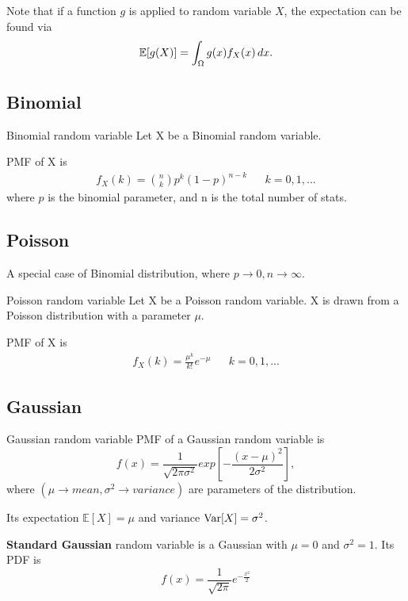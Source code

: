 Note that if a function $g$ is applied to random variable $X$, the expectation can be found via
\begin{equation*}
  \mathbb{E}[g(X)]=\int_{\Omega}g(x)f_X(x)\,dx.
\end{equation*}

\subsection{Binomial}

\begin{fact}{Binomial random variable}{}
  Let X be a Binomial random variable.

  PMF of X is
  \begin{align}
    f_X(k) = \binom{n}{k}p^k(1-p)^{n-k} &&k=0,1,...
  \end{align}
  where $p$ is the binomial parameter, and n is the total number of stats.

\end{fact}

\subsection{Poisson}
A special case of Binomial distribution, where $p\rightarrow0,n\rightarrow\infty$.

\begin{fact}{Poisson random variable}{}
  Let X be a Poisson random variable.
  X is drawn from a Poisson distribution with a parameter $\mu$.

  PMF of X is
  \begin{align}
    f_X(k) =  \frac{\mu^k}{k!}e^{-\mu} && k = 0,1,...
  \end{align}
\end{fact}

\subsection{Gaussian}

\begin{fact}{Gaussian random variable}{}
  PMF of a Gaussian random variable is
  \begin{equation*}
    f(x)=\frac{1}{\sqrt{2\pi\sigma^2}}exp\left[-\frac{(x-\mu)^2}{2\sigma^2}\right],
  \end{equation*}
  where $(\mu\rightarrow mean,\sigma^2\rightarrow variance)$ are parameters of the distribution.

  Its expectation $\mathbb{E}[X]=\mu$ and variance $\mathrm{Var}[X]=\sigma^2$.

  \textbf{Standard Gaussian} random variable is a Gaussian with $\mu=0$ and $\sigma^2=1$. Its PDF is
  \begin{equation*}
    f(x)=\frac{1}{\sqrt{2\pi}}e^{-\frac{x^2}{2}}
  \end{equation*}
\end{fact}

